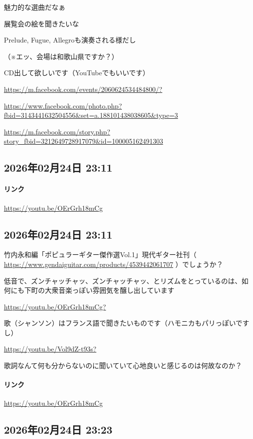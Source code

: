 魅力的な選曲だなぁ

展覧会の絵を聞きたいな

Prelude, Fugue, Allegroも演奏される様だし

（※エッ、会場は和歌山県ですか？）

CD出して欲しいです（YouTubeでもいいです）

\url{https://m.facebook.com/events/2060624534484800/?}

\url{https://www.facebook.com/photo.php?fbid=3143441632504556&set=a.188101438038605&type=3}

\url{https://m.facebook.com/story.php?story_fbid=3212649728917079&id=100005162491303}

\subsection*{2026年02月24日 23:11}

\paragraph{リンク}
\url{https://youtu.be/OErGrh18mCg}

\subsection*{2026年02月24日 23:11}

竹内永和編「ポピュラーギター傑作選Vol.1」現代ギター社刊（ \url{https://www.gendaiguitar.com/products/4539442061707} ）でしょうか？

低音で、ズンチャッチャッ、ズンチャッチャッ、とリズムをとっているのは、如何にも下町の大衆音楽っぽい雰囲気を醸し出しています

\url{https://youtu.be/OErGrh18mCg?}

歌（シャンソン）はフランス語で聞きたいものです（ハモニカもパリっぽいですし）

\url{https://youtu.be/Vol9dZ-t93s?}

歌詞なんて何も分からないのに聞いていて心地良いと感じるのは何故なのか？

\paragraph{リンク}
\url{https://youtu.be/OErGrh18mCg}

\subsection*{2026年02月24日 23:23}

